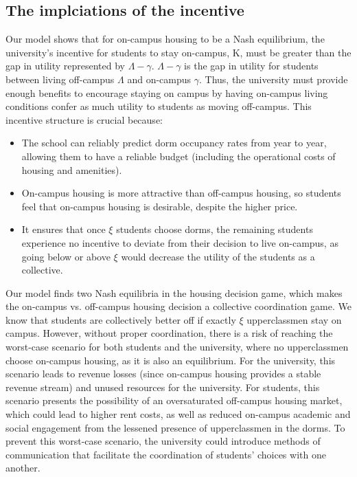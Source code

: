 \documentclass[12pt]{article}
\begin{document}
\subsection{The implciations of the incentive}
Our model shows that for on-campus housing to be a Nash equilibrium, the university’s incentive for students to stay on-campus, K, must be greater than the gap in utility represented by  $\Lambda - \gamma$. $\Lambda - \gamma$ is the gap in utility for students between living off-campus $\Lambda$ and on-campus $\gamma$. Thus, the university must provide enough benefits to encourage staying on campus by having on-campus living conditions confer as much utility to students as moving off-campus. This incentive structure is crucial because:
\begin{itemize}
    \item The school can reliably predict dorm occupancy rates from year to year, allowing them to have a reliable budget (including the operational costs of housing and amenities).
    \item On-campus housing is more attractive than off-campus housing, so students feel that on-campus housing is desirable, despite the higher price.
    \item It ensures that once $\xi$ students choose dorms, the remaining students experience no incentive to deviate from their decision to live on-campus, as going below or above $\xi$ would decrease the utility of the students as a collective.
\end{itemize}
Our model finds two Nash equilibria in the housing decision game, which makes the on-campus vs. off-campus housing decision a collective coordination game. We know that students are collectively better off if exactly $\xi$ upperclassmen stay on campus. However, without proper coordination, there is a risk of reaching the worst-case scenario for both students and the university, where no upperclassmen choose on-campus housing, as it is also an equilibrium. For the university, this scenario leads to revenue losses (since on-campus housing provides a stable revenue stream) and unused resources for the university. For students, this scenario presents the possibility of an oversaturated off-campus housing market, which could lead to higher rent costs, as well as reduced on-campus academic and social engagement from the lessened presence of upperclassmen in the dorms. To prevent this worst-case scenario, the university could introduce methods of communication that facilitate the coordination of students’ choices with one another.
\end{document}
